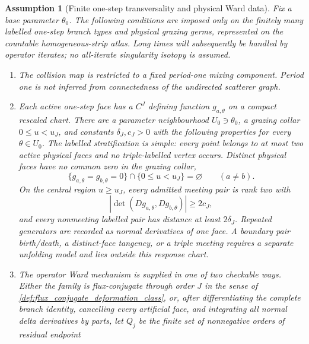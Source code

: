 \documentclass[11pt]{amsart}
\theoremstyle{compactplain}
\theoremstyle{compactdefinition}
\newtheorem{assumption}[theorem]{Assumption}
\theoremstyle{compactremark}
\begin{document}
\begin{assumption}[Finite one-step transversality and physical Ward data]
\label{ass:finite_order_clean_response_chart}
Fix a base parameter \(\theta_0\).  The following conditions are imposed only
on the finitely many labelled one-step branch types and physical grazing germs,
represented on the countable homogeneous-strip atlas.  Long times will subsequently
be handled by operator iterates; no all-iterate singularity isotopy is assumed.
\begin{enumerate}[label=\textup{(R\arabic*)},wide,labelindent=0pt]
  \item The collision map is restricted to a fixed period-one mixing
  component.  Period one is not inferred from connectedness of the undirected
  scatterer graph.
  \item Each active one-step face has a \(C^J\) defining function
  \(g_{a,\theta}\) on a compact rescaled chart.  There are a parameter
  neighbourhood \(U_0\ni\theta_0\), a grazing collar \(0\le u<u_J\), and
  constants \(\delta_J,c_J>0\) with the following properties for every
  \(\theta\in U_0\).  The labelled stratification is \emph{simple}: every
  point belongs to at most two active physical faces and no triple-labelled
  vertex occurs.  Distinct physical faces have no common zero in the grazing
  collar,
  \begin{equation}
  \label{eq:no_boundary_pair_birth}
    \{g_{a,\theta}=g_{b,\theta}=0\}\cap\{0\le u<u_J\}
      =\varnothing\qquad(a\ne b).
  \end{equation}
  On the central region \(u\ge u_J\), every admitted meeting pair is rank two
  with
  \begin{equation}
  \label{eq:central_clean_determinant}
    |\det(Dg_{a,\theta},Dg_{b,\theta})|\ge2c_J,
  \end{equation}
  and every nonmeeting labelled pair has distance at least \(2\delta_J\).
  Repeated generators are recorded as normal derivatives of one face.  A
  boundary pair birth/death, a distinct-face tangency, or a triple meeting
  requires a separate unfolding model and lies outside this response chart.
  \item The operator Ward mechanism is supplied in one of two checkable ways.
  Either the family is flux-conjugate through order \(J\) in the sense of
  \cref{def:flux_conjugate_deformation_class}, or, after differentiating the complete branch identity, cancelling every
  artificial face, and integrating all normal delta derivatives by parts, let
  \(Q_j\) be the finite set of nonnegative orders of residual endpoint

\end{enumerate}
\end{assumption}
\end{document}
